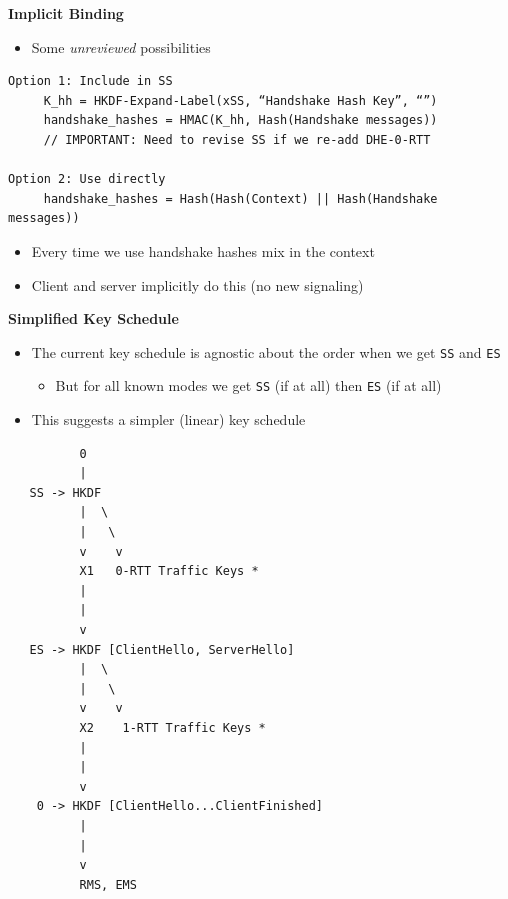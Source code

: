 \documentclass[helvetica]{seminar}
\newcommand{\heading}[1]{%
  \begin{center} 
    \large\bf 
    #1 
  \end{center} 
  \vspace{.4 in}}
\begin{document}
\begin{slide}
\heading{Implicit Binding}

\begin{itemize}
\item Some \emph{unreviewed} possibilities
\end{itemize}

{\scriptsize
\begin{verbatim}
Option 1: Include in SS
     K_hh = HKDF-Expand-Label(xSS, “Handshake Hash Key”, “”)
     handshake_hashes = HMAC(K_hh, Hash(Handshake messages))
     // IMPORTANT: Need to revise SS if we re-add DHE-0-RTT

Option 2: Use directly
     handshake_hashes = Hash(Hash(Context) || Hash(Handshake messages))
\end{verbatim}
}

\begin{itemize}
\item Every time we use handshake hashes mix in the context
\item Client and server implicitly do this (no new signaling)
\end{itemize}
\end{slide}


\begin{slide}
\begin{minipage}{2in}
\heading{Simplified Key Schedule}

\begin{itemize}
\item The current key schedule is agnostic about the order when we get \verb^SS^ and \verb^ES^
  \begin{itemize}
  \item But for all known modes we get \verb^SS^ (if at all) then \verb^ES^ (if at all)
  \end{itemize}

\item This suggests a simpler (linear) key schedule
\end{itemize}
\end{minipage}
\begin{minipage}{2in}
{\scriptsize
\begin{verbatim}
          0
          |
   SS -> HKDF 
          |  \
          |   \
          v    v
          X1   0-RTT Traffic Keys *
          |
          |
          v
   ES -> HKDF [ClientHello, ServerHello]
          |  \
          |   \
          v    v
          X2    1-RTT Traffic Keys *
          |  
          |
          v    
    0 -> HKDF [ClientHello...ClientFinished]
          |
          |
          v
          RMS, EMS
\end{verbatim}
}
\end{minipage}
\end{slide}
\end{document}
